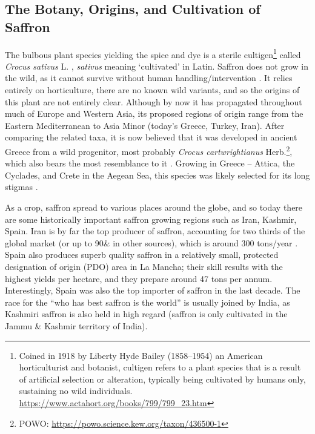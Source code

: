 \subsection{The Botany, Origins, and Cultivation of Saffron}

The bulbous plant species yielding the spice and dye is a sterile \gls{cultigen}\footnote{Coined in 1918 by Liberty Hyde Bailey (1858–1954) an American horticulturist and botanist, cultigen refers to a plant species that is a result of artificial selection or alteration, typically being cultivated by humans only, sustaining no wild individuals. \url{https://www.actahort.org/books/799/799_23.htm}} called \textit{Crocus sativus} L. \autocite[124]{van_wyk_culinary_2014}, \textit{sativus} meaning `cultivated' in Latin. Saffron does not grow in the wild, as it cannot survive without human handling/intervention \autocite[469]{peter_handbook_2012}. It relies entirely on horticulture, there are no known wild variants, and so the origins of this plant are not entirely clear. Although by now it has propagated throughout much of Europe and Western Asia, its proposed regions of origin range from the Eastern Mediterranean to Asia Minor (today's Greece, Turkey, Iran). After comparing the related taxa, it is now believed that it was developed in ancient Greece from a wild progenitor, most probably \textit{Crocus cartwrightianus} Herb.\footnote{POWO: \url{https://powo.science.kew.org/taxon/436500-1}}, which also bears the most resemblance to it \autocite{mathew_crocus_1977}. Growing in Greece -- Attica, the Cyclades, and Crete in the Aegean Sea, this species was likely selected for its long stigmas \autocite[248]{mabberley_mabberleys_2017}.




As a crop, saffron spread to various places around the globe, and so today there are some historically important saffron growing regions such as Iran, Kashmir, Spain. Iran is by far the top producer of saffron, accounting for two thirds of the global market (or up to 90\& in other sources), which is around 300 tons/year \autocite[248]{mabberley_mabberleys_2017}. Spain also produces superb quality saffron in a relatively small, protected designation of origin (PDO) area in La Mancha; their skill results with the highest yields per hectare, and they prepare around 47 tons per annum. Interestingly, Spain was also the top importer of saffron in the last decade. The race for the ``who has best saffron is the world'' is usually joined by India, as Kashmiri saffron is also held in high regard (saffron is only cultivated in the Jammu \& Kashmir territory of India). 

